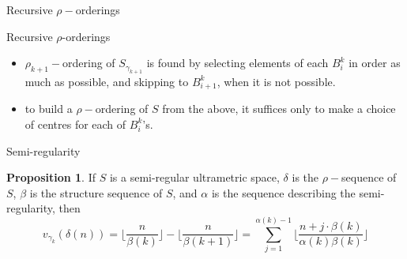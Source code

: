 \documentclass{beamer}
\theoremstyle{definition}
\newtheorem{proposition}{Proposition}
\begin{document}
\begin{frame}{Recursive $\rho-$orderings}
	\tikzset{font=\tiny,
	level distance=1.35cm,
}

\begin{center}
\end{center}
\end{frame}

\begin{frame}{Recursive $\rho$-orderings}
	

	\begin{itemize}
		\item $\rho_{k+1}-$ordering of $S_{\gamma_{k+1}}$ is found by selecting elements of each $B^k_i$ in order as much as possible, and skipping to $B^k_{i+1}$, when it is not possible.
		\pause
		\item  to build a $\rho-$ordering of $S$ from the above, it suffices only to make a choice of centres for each of $B^k_i$'s.
	\end{itemize}
\end{frame}


\begin{frame}{Semi-regularity}
\begin{proposition}
	If $S$ is a semi-regular ultrametric space, $\delta$ is the  $\rho-$sequence of $S$, $\beta$ is the structure sequence of $S$, and $\alpha$ is the sequence describing the semi-regularity, then
	\[v_{\gamma_k}(\delta(n)) =  \lfloor\frac{n}{\beta(k)}\rfloor - \lfloor\frac{n}{\beta(k+1)}\rfloor = \sum_{j=1}^{\alpha(k)-1} \lfloor \frac{n + j\cdot \beta(k)}{\alpha(k)\beta(k)} \rfloor\]
\end{proposition}

\end{frame}
\end{document}
